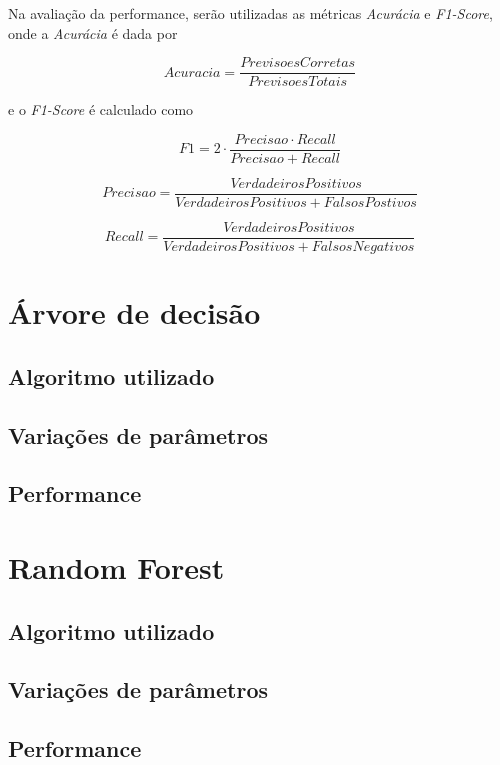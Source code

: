 \documentclass[12pt,a4paper]{article}
\begin{document}
Na avaliação da performance, serão utilizadas as métricas \textit{Acurácia} e \textit{F1-Score}, onde a \textit{Acurácia} é dada por

\begin{equation*}
	Acuracia = \frac{PrevisoesCorretas}{PrevisoesTotais} 
\end{equation*}

\noindent
 e o \textit{F1-Score} é calculado como
 
\begin{equation*}
F1 = 2 \cdot \frac{Precisao \cdot Recall}{Precisao + Recall}
\end{equation*}

\begin{equation*}
Precisao = \frac{VerdadeirosPositivos}{VerdadeirosPositivos + FalsosPostivos} 
\end{equation*}

\begin{equation*}
Recall = \frac{VerdadeirosPositivos}{VerdadeirosPositivos + FalsosNegativos} 
\end{equation*}

\newpage
\section{Árvore de decisão}
\subsection{Algoritmo utilizado}
\subsection{Variações de parâmetros}
\subsection{Performance}

\newpage
\section{Random Forest}
\subsection{Algoritmo utilizado}
\subsection{Variações de parâmetros}
\subsection{Performance}
\end{document}

